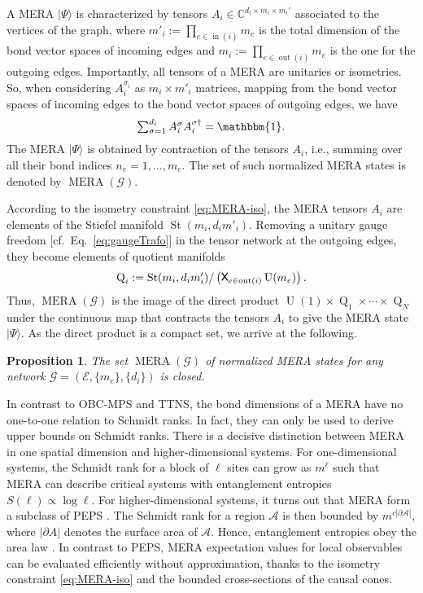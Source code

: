 \documentclass[english,11pt,aps,pra,onecolumn,tightenlines,groupedaddress,superscriptaddress,notitlepage,floatfix,fleqn]{revtex4-1}
\newcommand{\id}{\mathbbm{1}}
\newcommand{\ket}{\rangle}
\newcommand{\s}{\sigma}
\newcommand{\CC}{\mathbb{C}}
\newcommand{\mc}[1]{\mathcal{#1}}
\newcommand{\A}{\mc{A}}
\newcommand{\E}{\mc{E}}
\newcommand{\G}{\mc{G}}
\newcommand{\In}{\operatorname{in}}
\newcommand{\Out}{\operatorname{out}}
\newcommand{\MERA}{\operatorname{MERA}}
\newcommand{\St}{\operatorname{St}}
\newcommand{\U}{\operatorname{U}}
\newcommand{\Q}{\operatorname{Q}}
\newcommand{\bigtimes}{\mathop{\tikz [x=1.2ex,y=1.6ex,line width=.2ex] \draw (0,0) -- (1,1) (0,1) -- (1,0);}}
\newtheorem{prop}{Proposition}
\begin{document}
A MERA $|\Psi\ket$ is characterized by tensors $A_i\in\CC^{d_i\times m_i\times m_i'}$ associated to the vertices of the graph, where $m'_i:=\prod_{e\in\In(i)}m_{e}$ is the total dimension of the bond vector spaces of incoming edges and $m_i:=\prod_{e\in\Out(i)}m_{e}$ is the one for the outgoing edges. Importantly, all tensors of a MERA are unitaries or isometries. So, when considering $A^{\s_i}_i$ as $m_i\times m'_i$ matrices, mapping from the bond vector spaces of incoming edges to the bond vector spaces of outgoing edges, we have
\begin{equation}\label{eq:MERA-iso}\textstyle
	\sum_{\s=1}^{d_i} A_i^\s A_i^{\s\dag}=\id.
\end{equation}
The MERA $|\Psi\ket$ is obtained by contraction of the tensors $A_i$, i.e., summing over all their bond indices $n_e=1,\dots,m_e$. The set of such normalized MERA states is denoted by $\MERA(\G)$.

According to the isometry constraint \eqref{eq:MERA-iso}, the MERA tensors $A_i$ are elements of the Stiefel manifold $\St(m_i,d_i m'_i)$. Removing a unitary gauge freedom [cf.\ Eq.~\eqref{eq:gaugeTrafo}] in the tensor network at the outgoing edges, they become elements of quotient manifolds
\begin{equation}\textstyle
	\Q_i:=\St(m_i,d_i m'_i)/\left(\bigtimes_{e\in\Out(i)}\U(m_e)\right).
\end{equation}
Thus, $\MERA(\G)$ is the image of the direct product $\U(1)\times\Q_1\times\dotsb\times \Q_N$ under the continuous map that contracts the tensors $A_i$ to give the MERA state $|\Psi\ket$. As the direct product is a compact set, we arrive at the following.
\begin{prop}\label{prop:MERA}
The set $\MERA(\G)$ of normalized MERA states for any network $\G=(\E,\{m_e\},\{d_i\})$ is closed.
\end{prop}

In contrast to OBC-MPS and TTNS, the bond dimensions of a MERA have no one-to-one relation to Schmidt ranks. In fact, they can only be used to derive upper bounds on Schmidt ranks. There is a decisive distinction between MERA in one spatial dimension and higher-dimensional systems. For one-dimensional systems, the Schmidt rank for a block of $\ell$ sites can grow as $m^\ell$ such that MERA can describe critical systems with entanglement entropies $S(\ell)\propto\log\ell$. For higher-dimensional systems, it turns out that MERA form a subclass of PEPS \cite{Barthel2010-105}. The Schmidt rank for a region $\A$ is then bounded by $m^{c|\partial\A|}$, where $|\partial A|$ denotes the surface area of $\A$. Hence, entanglement entropies obey the area law \cite{Eisert2008,Latorre2009,Laflorencie2016-646}. In contrast to PEPS, MERA expectation values for local observables can be evaluated efficiently without approximation, thanks to the isometry constraint \eqref{eq:MERA-iso} and the bounded cross-sections of the causal cones.
\end{document}
